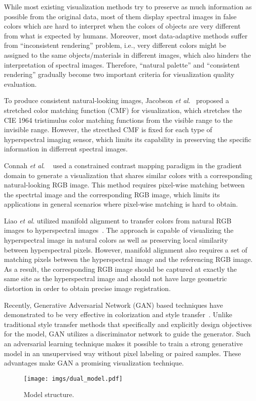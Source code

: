 \documentclass[10pt,conference,a4paper]{IEEEtran}
\begin{document}
While most existing visualization methods try to preserve as much information as possible from the original data,
most of them display spectral images in false colors which are hard to interpret when the colors of objects are very different from what is expected by humans.
Moreover, most data-adaptive methods suffer from ``inconsistent rendering'' problem, i.e., very different colors might be assigned to the same objects/materials in different images, which also hinders the interpretation of spectral images.
Therefore, ``natural palette'' and ``consistent rendering'' gradually become two important criteria for visualization quality evaluation.

To produce consistent natural-looking images, Jacobson \emph{et al}.~\cite{jacobson2005design} %
proposed a stretched color matching function (CMF) for visualization, which stretches the
CIE 1964 tristimulus color matching functions from the visible range to the invisible range.
However, the strecthed CMF is fixed for each type of hyperspectral imaging sensor, which limits its capability in preserving the specific information in differrent spectral images.


Connah \emph{et al}. ~\cite{Connah2014} used a constrained contrast mapping paradigm in the gradient domain to generate a visualization that shares similar colors with a corresponding natural-looking RGB image. This method requires pixel-wise matching between the spectrtal image and the corresponding RGB image, which limits its applications in general scenarios where pixel-wise matching is hard to obtain.

Liao \emph{et al}. utilized manifold alignment to transfer colors from natural RGB images to hyperspectral images~\cite{liao2016hscolor,liao2014hscolor,liao2013hscolor}.
The approach is capable of visualizing the hyperspectral image in natural colors as well as preserving local similarity between hyperspectral pixels.
However, manifold alignment also requires a set of matching pixels between the hyperspectral image and the referencing RGB image. As a result, the corresponding RGB image should be captured at exactly the same site as the hyperspectral image and should not have large geometric distortion in order to obtain precise image registration.

Recently, Generative Adversarial Network (GAN) based techniques have demonstrated to be very effective in colorization and style transfer~\cite{cyclegan,pix2pix,dcgan}. Unlike traditional style transfer methods that specifically and explicitly design objectives for the model, GAN utilizes a discriminator network to guide the generator. Such an adversarial learning technique makes it possible to train a strong generative model in an unsupervised way without pixel labeling or paired samples. These advantages make GAN a promising visualization technique.
\begin{figure}[!t]
\centering
\texttt{[image: imgs/dual\_model.pdf]}
\caption{Model structure.}
\label{fig:model}
\end{figure}
\end{document}
